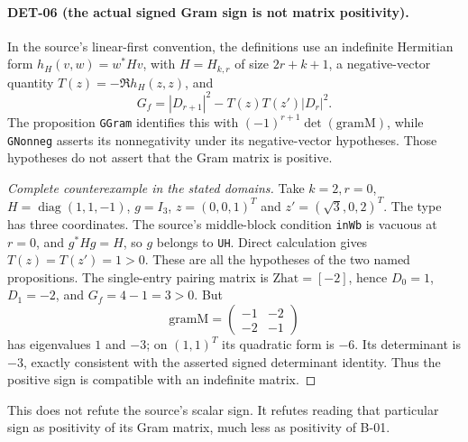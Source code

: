 \documentclass[11pt,a4paper]{article}
\newcommand{\diag}{\operatorname{diag}}
\newcommand{\fid}[1]{\textsf{#1}}
\begin{document}
\paragraph{DET-06 (the actual signed Gram sign is not matrix positivity).}
In the source's linear-first convention, the definitions use an indefinite Hermitian form $h_H(v,w)=w^*Hv$, with $H=H_{k,r}$ of size $2r+k+1$, a negative-vector quantity $T(z)=-\Re h_H(z,z)$, and
\[
 G_f=|D_{r+1}|^2-T(z)T(z')|D_r|^2.
\]
The proposition \texttt{GGram} identifies this with $(-1)^{r+1}\det(\mathrm{gramM})$, while \texttt{GNonneg} asserts its nonnegativity under its negative-vector hypotheses. Those hypotheses do not assert that the Gram matrix is positive.
\begin{proof}[Complete counterexample in the stated domains]
Take $k=2,r=0$, $H=\diag(1,1,-1)$, $g=I_3$, $z=(0,0,1)^T$ and $z'=(\sqrt3,0,2)^T$. The type has three coordinates. The source's middle-block condition \texttt{inWb} is vacuous at $r=0$, and $g^*Hg=H$, so $g$ belongs to \texttt{UH}. Direct calculation gives $T(z)=T(z')=1>0$. These are all the hypotheses of the two named propositions. The single-entry pairing matrix is $\mathrm{Zhat}=[-2]$, hence $D_0=1$, $D_1=-2$, and $G_f=4-1=3>0$. But
\[
 \mathrm{gramM}=\begin{pmatrix}-1&-2\\-2&-1\end{pmatrix}
\]
has eigenvalues $1$ and $-3$; on $(1,1)^T$ its quadratic form is $-6$. Its determinant is $-3$, exactly consistent with the asserted signed determinant identity. Thus the positive sign is compatible with an indefinite matrix.
\end{proof}
This does not refute the source's scalar sign. It refutes reading that particular sign as positivity of its Gram matrix, much less as positivity of \fid{B-01}.
\end{document}
